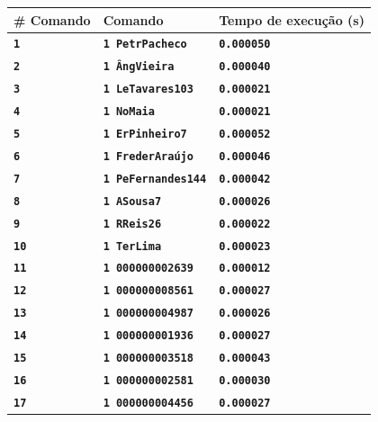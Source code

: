 \documentclass[12pt,a4paper]{report}
\begin{document}
\begin{tabularx}{\textwidth} { 
  | >{\centering\arraybackslash}X 
  | >{\centering\arraybackslash}X 
  | >{\centering\arraybackslash}X | }
 \hline
 \textbf{\# Comando} & \textbf{Comando} & \textbf{Tempo de execução (s)} \\
 \hline
 \texttt{\textbf{1}} & \texttt{\textbf{1 PetrPacheco}}  & \texttt{\textbf{0.000050}}  \\
 \hline
 \texttt{\textbf{2}} & \texttt{\textbf{1 ÂngVieira}}  & \texttt{\textbf{0.000040}}  \\
 \hline
 \texttt{\textbf{3}} & \texttt{\textbf{1 LeTavares103}}  & \texttt{\textbf{0.000021}}  \\
 \hline
 \texttt{\textbf{4}} & \texttt{\textbf{1 NoMaia}}  & \texttt{\textbf{0.000021}}  \\
 \hline
 \texttt{\textbf{5}} & \texttt{\textbf{1 ErPinheiro7}}  & \texttt{\textbf{0.000052}}  \\
 \hline
 \texttt{\textbf{6}} & \texttt{\textbf{1 FrederAraújo}}  & \texttt{\textbf{0.000046}}  \\
 \hline
 \texttt{\textbf{7}} & \texttt{\textbf{1 PeFernandes144}}  & \texttt{\textbf{0.000042}}  \\
 \hline
 \texttt{\textbf{8}} & \texttt{\textbf{1 ASousa7}}  & \texttt{\textbf{0.000026}}  \\
 \hline
 \texttt{\textbf{9}} & \texttt{\textbf{1 RReis26}}  & \texttt{\textbf{0.000022}}  \\
 \hline
 \texttt{\textbf{10}} & \texttt{\textbf{1 TerLima}}  & \texttt{\textbf{0.000023}}  \\
 \hline
 \texttt{\textbf{11}} & \texttt{\textbf{1 000000002639}}  & \texttt{\textbf{0.000012}}  \\
 \hline
 \texttt{\textbf{12}} & \texttt{\textbf{1 000000008561}}  & \texttt{\textbf{0.000027}}  \\
 \hline
 \texttt{\textbf{13}} & \texttt{\textbf{1 000000004987}}  & \texttt{\textbf{0.000026}}  \\
 \hline
 \texttt{\textbf{14}} & \texttt{\textbf{1 000000001936}}  & \texttt{\textbf{0.000027}}  \\
 \hline
 \texttt{\textbf{15}} & \texttt{\textbf{1 000000003518}}  & \texttt{\textbf{0.000043}}  \\
 \hline
 \texttt{\textbf{16}} & \texttt{\textbf{1 000000002581}}  & \texttt{\textbf{0.000030}}  \\
 \hline
 \texttt{\textbf{17}} & \texttt{\textbf{1 000000004456}}  & \texttt{\textbf{0.000027}}  \\

\end{tabularx}
\end{document}
